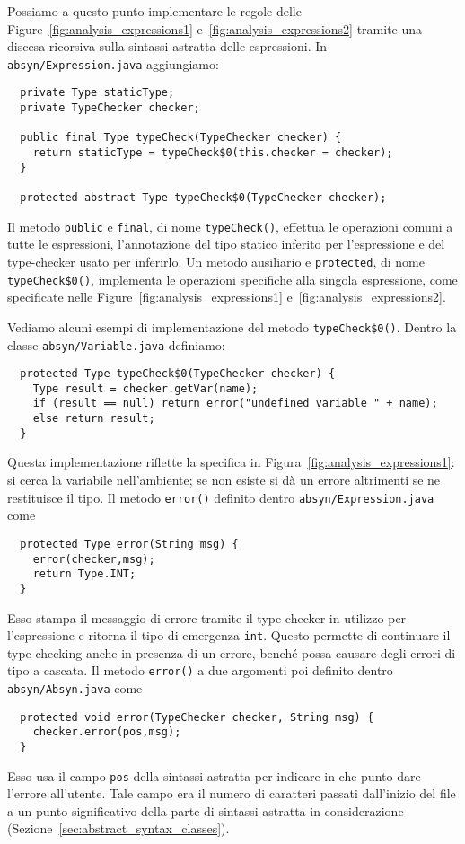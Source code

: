 Possiamo a questo punto implementare le regole
delle Figure~\ref{fig:analysis_expressions1} e~\ref{fig:analysis_expressions2}
tramite una discesa ricorsiva sulla sintassi astratta delle espressioni. In
\texttt{absyn/Expression.java} aggiungiamo:
%
\begin{verbatim}
  private Type staticType;
  private TypeChecker checker;

  public final Type typeCheck(TypeChecker checker) {
    return staticType = typeCheck$0(this.checker = checker);
  }

  protected abstract Type typeCheck$0(TypeChecker checker);
\end{verbatim}
%
Il metodo \texttt{public} e \texttt{final}, di nome \texttt{typeCheck()},
effettua le operazioni comuni a tutte le espressioni, \cioe
l'annotazione del tipo statico inferito per l'espressione e del type-checker
usato per inferirlo. Un metodo ausiliario e \texttt{protected}, di nome
\texttt{typeCheck\$0()}, implementa le operazioni specifiche alla singola
espressione, come specificate nelle Figure~\ref{fig:analysis_expressions1}
e~\ref{fig:analysis_expressions2}.

Vediamo alcuni esempi di implementazione del metodo \texttt{typeCheck\$0()}.
Dentro la classe \texttt{absyn/Variable.java} definiamo:
%
\begin{verbatim}
  protected Type typeCheck$0(TypeChecker checker) {
    Type result = checker.getVar(name);
    if (result == null) return error("undefined variable " + name);
    else return result;
  }
\end{verbatim}
Questa implementazione riflette la specifica in
Figura~\ref{fig:analysis_expressions1}: si cerca la variabile
nell'ambiente; se non esiste si d\`a un errore
altrimenti se ne restituisce il tipo.
Il metodo \texttt{error()} \e definito dentro
\texttt{absyn/Expression.java} come
%
\begin{verbatim}
  protected Type error(String msg) {
    error(checker,msg);
    return Type.INT;
  }
\end{verbatim}
%
Esso stampa il messaggio di errore tramite il type-checker
in utilizzo per l'espressione e ritorna il tipo di emergenza \texttt{int}.
Questo permette di continuare il type-checking anche in presenza di un
errore, bench\'e possa causare degli errori di tipo a cascata.
Il metodo \texttt{error()} a due argomenti \e poi definito dentro
\texttt{absyn/Absyn.java} come
%
\begin{verbatim}
  protected void error(TypeChecker checker, String msg) {
    checker.error(pos,msg);
  }
\end{verbatim}
%
Esso usa il campo \texttt{pos} della sintassi astratta per indicare in che
punto dare l'errore all'utente. Tale campo era il numero di caratteri
passati dall'inizio del file a un punto significativo della parte di sintassi
astratta in considerazione (Sezione~\ref{sec:abstract_syntax_classes}).

